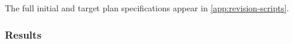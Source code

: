 


The full initial and target plan specifications appear in \autoref{app:revision-scripts}.


\subsubsection{Results}
%
%
%
%
%
%
%
%

